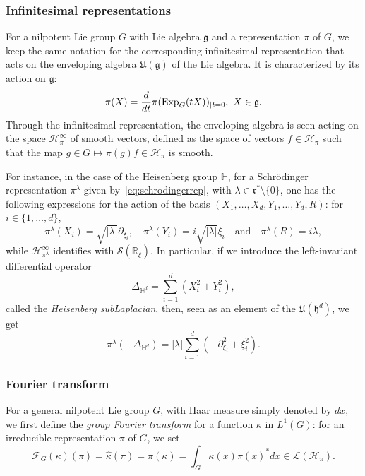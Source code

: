 \documentclass[12pt,a4paper]{amsart}
\theoremstyle{plain}
\theoremstyle{definition}
\theoremstyle{remark}
\numberwithin{equation}{section}
\theoremstyle{definition}
\def\R{{\mathbb R}}%
\def \Exp{{\rm Exp}}
\def \cS{\mathcal{S}}
\def \Heis{\mathbb{H}}
\def \cH{\mathcal{H}}
\def \cF{\mathcal{F}}
\def \fg{\mathfrak{g}}
\def \fh{\mathfrak{h}}
\def \fr{\mathfrak{r}}
\numberwithin{equation}{section}
\begin{document}
\subsubsection{Infinitesimal representations} For a nilpotent Lie group $G$ with Lie algebra $\fg$ and a representation $\pi$ of $G$, we keep the same notation for the corresponding infinitesimal representation that acts on the enveloping algebra $\mathfrak{U}(\fg)$ of the Lie algebra. It is characterized by its action on $\fg$:
\begin{equation*}
    \pi(X) = \frac{d}{dt}\pi(\Exp_G(t X))_{|t=0},\ X\in\fg.
\end{equation*}
Through the infinitesimal representation, the enveloping algebra is seen acting on the space $\cH_{\pi}^\infty$ of smooth vectors, defined as the space of vectors $f\in\cH_\pi$ such that the map $g\in G\mapsto \pi(g)f\in\cH_\pi$ is smooth.

For instance, in the case of the Heisenberg group $\Heis$, for a Schrödinger representation $\pi^\lambda$ given by~\eqref{eq:schrodingerrep}, with $\lambda\in\fr^*\setminus\{0\}$, one has the following expressions for the action of the basis $(X_1,\dots,X_d,Y_1,\dots,Y_d,R)$: for $i\in\{1,\dots,d\}$,
\begin{equation*}
    \pi^\lambda(X_i) = \sqrt{|\lambda|} \partial_{\xi_i},\quad 
    \pi^\lambda(Y_i) = i\sqrt{|\lambda|} \xi_i\quad\mbox{and}\quad
    \pi^\lambda(R) = i\lambda,
\end{equation*}
while $\cH_{\pi^\lambda}^\infty$ identifies with $\cS(\R_\xi)$.
In particular, if we introduce the left-invariant differential operator 
\begin{equation*}
    \Delta_{\Heis^d} = \sum_{i=1}^d (X_{i}^2 + Y_{i}^2),
\end{equation*}
called the \emph{Heisenberg subLaplacian}, then, seen as an element of the $\mathfrak{U}(\fh^d)$, we get 
\begin{equation*}
    \pi^\lambda(-\Delta_{\Heis^d}) = |\lambda|\sum_{i=1}^d (-\partial_{\xi_i}^2 + \xi_{i}^2).
\end{equation*}

\subsubsection{Fourier transform} 

For a general nilpotent Lie group $G$, with Haar measure simply denoted by $dx$, we first define the \emph{group Fourier transform} for a function $\kappa$ in $L^1(G)$:
for an irreducible representation $\pi$ of $G$, we set 
\begin{equation*}
 \cF_G(\kappa)(\pi) = \hat{\kappa}(\pi) = \pi(\kappa) = \int_G \kappa(x) \pi(x)^* dx\in \mathcal{L}(\cH_\pi).
\end{equation*}
\end{document}
